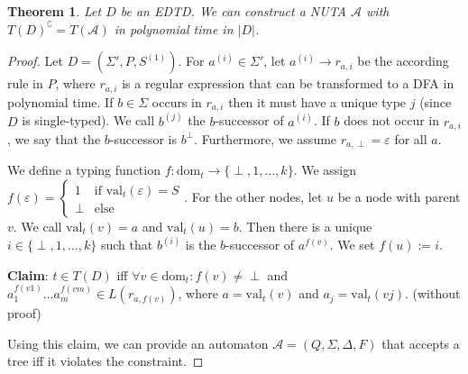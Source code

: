 \documentclass{article}
\newtheorem{theorem}{Theorem}
\begin{document}
\vspace{1cm}
\begin{theorem}
\label{edtd_complto_nuta}
	Let $D$ be an EDTD. We can construct a NUTA $\mathcal{A}$ with $T(D)^\complement = T(\mathcal{A})$ in polynomial time in $|D|$.
\end{theorem}
\begin{proof}
	Let $D = (\Sigma', P, S^{(1)})$. For $a^{(i)} \in \Sigma'$, let $a^{(i)} \rightarrow r_{a,i}$ be the according rule in $P$, where $r_{a,i}$ is a regular expression that can be transformed to a DFA in polynomial time. If $b \in \Sigma$ occurs in $r_{a,i}$ then it must have a unique type $j$ (since $D$ is single-typed). We call $b^{(j)}$ the $b$-successor of $a^{(i)}$. If $b$ does not occur in $r_{a,i}$, we say that the $b$-successor is $b^\perp$. Furthermore, we assume $r_{a,\perp} = \varepsilon$ for all $a$.
	
	We define a typing function $f : \text{dom}_t \rightarrow \{\perp, 1, \dots, k\}$. We assign $f(\varepsilon) = \begin{cases} 1 & \text{if } \text{val}_t(\varepsilon) = S \\ \perp & \text{else} \end{cases}$. For the other nodes, let $u$ be a node with parent $v$. We call $\text{val}_t(v) = a$ and $\text{val}_t(u) = b$. Then there is a unique $i \in \{\perp, 1, \dots, k\}$ such that $b^{(i)}$ is the $b$-successor of $a^{f(v)}$. We set $f(u) := i$.
	
	\textbf{Claim}: $t \in T(D)$ iff $\forall v \in \text{dom}_t: f(v) \neq \perp$ and $a_1^{f(v1)} \dots a_m^{f(vm)} \in L(r_{a,f(v)})$, where $a = \text{val}_t(v)$ and $a_j = \text{val}_t(vj)$. (without proof)
	
	Using this claim, we can provide an automaton $\mathcal{A} = (Q, \Sigma, \Delta, F)$ that accepts a tree iff it violates the constraint.
	

\end{proof}
\end{document}
